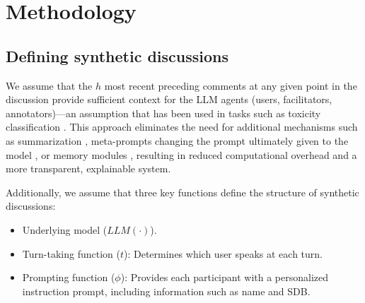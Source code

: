 %

\section{Methodology}
\label{sec:methodology}

\subsection{Defining synthetic discussions}
\label{ssec:methodology:discussions}



We assume that the $h$ most recent preceding comments at any given point in the discussion provide sufficient context for the \ac{LLM} agents (users, facilitators, annotators)—an assumption that has been used in tasks such as toxicity classification \cite{pavlopoulos_2020_toxicity}. This approach eliminates the need for additional mechanisms such as summarization \cite{balog_2024}, meta-prompts changing the prompt ultimately given to the model \cite{yu_2024_fincon}, or memory modules \cite{Vezhnevets2023GenerativeAM}, resulting in reduced computational overhead and a more transparent, explainable system.

Additionally, we assume that three key functions define the structure of synthetic discussions:
\begin{itemize}[nosep, noitemsep]
    \item Underlying model ($\textit{LLM}(\cdot)$).
    \item Turn-taking function ($t$): Determines which user speaks at each turn.
    \item Prompting function ($\phi$): Provides each participant with a personalized instruction prompt, including information such as name and \ac{SDB}.
\end{itemize}

